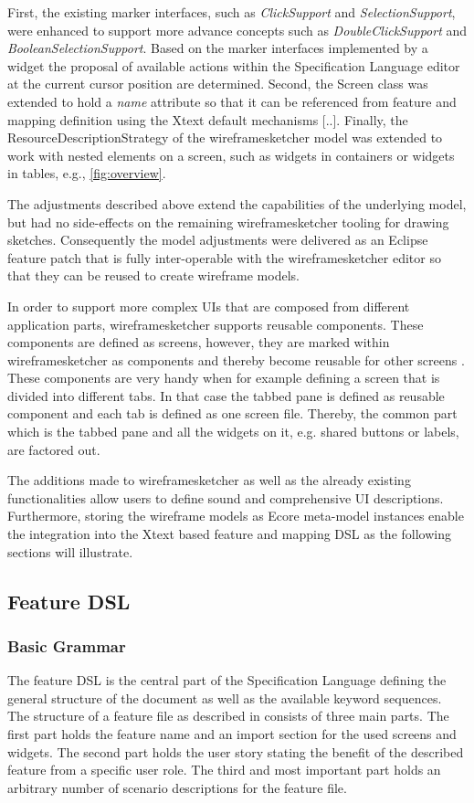 \documentclass{sig-alternate-05-2015}
\begin{document}
First, the existing marker interfaces, such as \textit{ClickSupport} and \textit{SelectionSupport}, were enhanced to support more advance concepts such as \textit{DoubleClickSupport} and \textit{BooleanSelectionSupport}.
Based on the marker interfaces implemented by a widget the proposal of available actions within the Specification Language editor at the current cursor position are determined.
Second, the Screen class was extended to hold a \textit{name} attribute so that it can be referenced from feature and mapping definition using the Xtext default mechanisms [..].
Finally, the ResourceDescriptionStrategy \cite{xtext.resourcedesc} of the wireframesketcher model was extended to work with nested elements on a screen, such as widgets in containers or widgets in tables, e.g., \cref{fig:overview}.

The adjustments described above extend the capabilities of the underlying model, but had no side-effects on the remaining wireframesketcher tooling for drawing sketches.
Consequently the model adjustments were delivered as an Eclipse feature patch that is fully inter-operable with the wireframesketcher editor so that they can be reused to create wireframe models.

In order to support more complex UIs that are composed from different application parts, wireframesketcher supports reusable components.
These components are defined as screens, however, they are marked within wireframesketcher as components and thereby become reusable for other screens \cite{Wireframesketcher.components}.
These components are very handy when for example defining a screen that is divided into different tabs.
In that case the tabbed pane is defined as reusable component and each tab is defined as one screen file.
Thereby, the common part which is the tabbed pane and all the widgets on it, e.g. shared buttons or labels, are factored out.

The additions made to wireframesketcher as well as the already existing functionalities allow users to define sound and comprehensive UI descriptions. 
Furthermore, storing the wireframe models as Ecore meta-model instances enable the integration into the Xtext based feature and mapping DSL as the following sections will illustrate.

\subsection{Feature DSL}
\subsubsection{Basic Grammar}
The feature DSL is the central part of the Specification Language defining the general structure of the document as well as the available keyword sequences.
The structure of a feature file as described in  consists of three main parts.
The first part holds the feature name and an import section for the used screens and widgets.
The second part holds the user story stating the benefit of the described feature from a specific user role.
The third and most important part holds an arbitrary number of scenario descriptions for the feature file.
\end{document}
